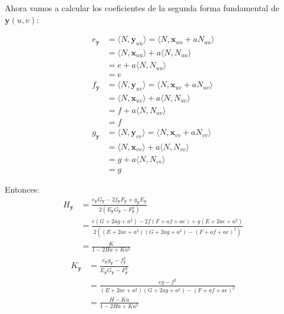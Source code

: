 \begin{problema}
\begin{enumerate}
\begin{sol}
Ahora vamos a calcular los coeficientes de la segunda forma fundamental de $\mathbf{y}(u, v)$:

\begin{align*}
    e_{\mathbf{y}} &= \langle N, \mathbf{y}_{uu} \rangle = \langle N, \mathbf{x}_{uu} + a N_{uu} \rangle \\
    &= \langle N, \mathbf{x}_{uu} \rangle + a \langle N, N_{uu} \rangle \\
    &= e + a\langle N, N_{uu} \rangle \\
    &= e\\
    f_{\mathbf{y}} &= \langle N, \mathbf{y}_{uv} \rangle = \langle N, \mathbf{x}_{uv} + a N_{uv} \rangle \\
    &= \langle N, \mathbf{x}_{uv} \rangle + a \langle N, N_{uv} \rangle \\
    &= f + a\langle N, N_{uv} \rangle \\
    &= f\\
    g_{\mathbf{y}} &= \langle N, \mathbf{y}_{vv} \rangle = \langle N, \mathbf{x}_{vv} + a N_{vv} \rangle \\
    &= \langle N, \mathbf{x}_{vv} \rangle + a \langle N, N_{vv} \rangle \\
    &= g + a\langle N, N_{vv} \rangle \\
    &= g
\end{align*}

Entonces: 
\begin{align*}
    H_{\mathbf{y}} &= \frac{e_{\mathbf{y}} G_{\mathbf{y}} - 2 f_{\mathbf{y}} F_{\mathbf{y}} + g_{\mathbf{y}} E_{\mathbf{y}}}{2( E_{\mathbf{y}} G_{\mathbf{y}} - F_{\mathbf{y}}^2)} \\
    &= \frac{e (G+2ag+a^2) - 2 f (F+af+ae) +g (E+2ae+a^2) }{2((E+2ae+a^2) (G+2ag+a^2) - (F+af+ae)^2)} \\
    &= \frac{K}{1-2 H a+K a^{2}}
\end{align*}
\begin{align*}
    K_{\mathbf{y}} &= \frac{e_{\mathbf{y}} g_{\mathbf{y}} - f_{\mathbf{y}}^2}{E_{\mathbf{y}} G_{\mathbf{y}} - F_{\mathbf{y}}^2}\\
    &= \frac{e g - f^2}{(E+2ae+a^2) (G+2ag+a^2) - (F+af+ae)^2}\\
    &=\frac{H-Ka}{1-2 H a+K a^{2}}
\end{align*}


        \end{sol}
        

    \end{enumerate}


\end{problema}



